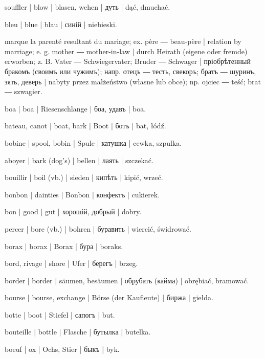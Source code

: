\begin{outdent}{1em}
souffler | blow | blasen, wehen | дуть | dąć, dmuchać.

bleu | blue | blau | синій | niebieski.

marque la parenté resultant du mariage; ex.  père ―
 beau-père | relation by marriage; e. g.  mother
―  mother-in-law | durch Heirath (eigene oder fremde)
erworben; z. B.  Vater ―  Schwiegervater; 
Bruder ―  Schwager | пріобрѣтенный бракомъ (своимъ или
чужимъ); напр.  отецъ ―  тесть, свекоръ; 
братъ ―  шуринъ, зять, деверь | nabyty przez małżeństwo
(własne lub obce); np.  ojciec ―  teść; 
brat ―  szwagier.

boa | boa | Riesenschlange | боа, удавъ | boa.

bateau, canot | boat, bark | Boot | ботъ | bat, łódź.

bobine | spool, bobin | Spule | катушка | cewka, szpulka.

aboyer | bark (dog’s) | bellen | лаять | szczekać.

bouillir | boil (vb.) | sieden | кипѣть | kipić, wrzeć.

bonbon | dainties | Bonbon | конфектъ | cukierek.

bon | good | gut | хорошій, добрый | dobry.

percer | bore (vb.) | bohren | буравить | wiercić, świdrować.

borax | borax | Borax | бура | boraks.

bord, rivage | shore | Ufer | берегъ | brzeg.

border | border | säumen, besäumen | обрубать (кайма) | obrębiać, bramować.

bourse | bourse, exchange | Börse (der Kaufleute) | биржа | giełda.

botte | boot | Stiefel | сапогъ | but.

bouteille | bottle | Flasche | бутылка | butelka.

boeuf | ox | Ochs, Stier | быкъ | byk.


\end{outdent}
